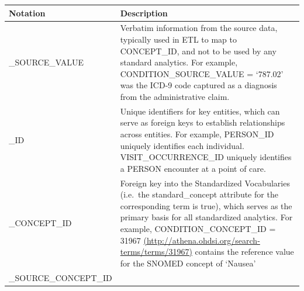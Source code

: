 \documentclass[]{book}
\begin{document}
\begin{longtable}[]{@{}ll@{}}
\toprule
\begin{minipage}[b]{0.24\columnwidth}\raggedright\strut
Notation\strut
\end{minipage} & \begin{minipage}[b]{0.70\columnwidth}\raggedright\strut
Description\strut
\end{minipage}\tabularnewline
\midrule
\endhead
\begin{minipage}[t]{0.24\columnwidth}\raggedright\strut
\_SOURCE\_VALUE\strut
\end{minipage} & \begin{minipage}[t]{0.70\columnwidth}\raggedright\strut
Verbatim information from the source data, typically used in ETL to map
to CONCEPT\_ID, and not to be used by any standard analytics. For
example, CONDITION\_SOURCE\_VALUE = `787.02' was the ICD-9 code captured
as a diagnosis from the administrative claim.\strut
\end{minipage}\tabularnewline
\begin{minipage}[t]{0.24\columnwidth}\raggedright\strut
\_ID\strut
\end{minipage} & \begin{minipage}[t]{0.70\columnwidth}\raggedright\strut
Unique identifiers for key entities, which can serve as foreign keys to
establish relationships across entities. For example, PERSON\_ID
uniquely identifies each individual. VISIT\_OCCURRENCE\_ID uniquely
identifies a PERSON encounter at a point of care.\strut
\end{minipage}\tabularnewline
\begin{minipage}[t]{0.24\columnwidth}\raggedright\strut
\_CONCEPT\_ID\strut
\end{minipage} & \begin{minipage}[t]{0.70\columnwidth}\raggedright\strut
Foreign key into the Standardized Vocabularies (i.e.~the
standard\_concept attribute for the corresponding term is true), which
serves as the primary basis for all standardized analytics. For example,
CONDITION\_CONCEPT\_ID = 31967
\href{http://athena.ohdsi.org/search-terms/terms/31967}{(http://athena.ohdsi.org/search-terms/terms/31967)}
contains the reference value for the SNOMED concept of `Nausea'\strut
\end{minipage}\tabularnewline
\begin{minipage}[t]{0.24\columnwidth}\raggedright\strut
\_SOURCE\_CONCEPT\_ID\strut
\end{minipage} & \begin{minipage}[t]{0.70\columnwidth}\raggedright\strut

\end{minipage}
\end{longtable}
\end{document}
